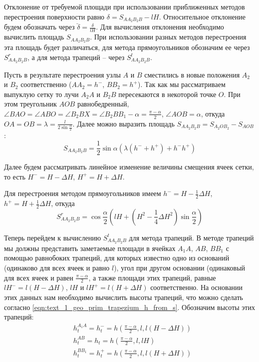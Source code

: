 Отклонение от требуемой площади при использовании приближенных методов перестроения поверхности равно $\delta = S_{AA_2B_2B} - lH$.
Относительное отклонение будем обозначать через $\breve{\delta} = \frac{\delta}{lH}$.
Для вычисления отклонения необходимо вычислить площадь $S_{AA_2B_2B}$.
При использовании разных методов перестроения эта площадь будет различаться, для метода прямоугольников обозначим ее через $S_{AA_2B_2B}^r$, а для метода трапеций -- через $S_{AA_2B_2B}^t$.

Пусть в результате перестроения узлы $A$ и $B$ сместились в новые положения $A_2$ и $B_2$ соответственно ($AA_2 = h^{-}$, $BB_2 = h^{+}$).
Так как мы рассматриваем выпуклую сетку то лучи $A_2A$ и $B_2B$ пересекаются в некоторой точке $O$.
При этом треугольник $AOB$ равнобедренный, $\angle BAO = \angle ABO = \angle B_2BX = \angle B_2BB_1 - \alpha = \frac{\pi - \alpha}{2}$, $\angle AOB = \alpha$, откуда $OA = OB = \lambda = \frac{l}{2 \sin \frac{\alpha}{2}}$.
Далее можно выразить площадь $S_{AA_2B_2B} = S_{A_2OB_2} - S_{AOB}$:
\begin{equation}\label{eqn:text_1_remesh2_saa2b2b_gen}
	S_{AA_2B_2B} = \frac{1}{2} \sin \alpha \left( \lambda(h^{-} + h^{+}) + h^{-}h^{+} \right)
\end{equation}

Далее будем рассматривать линейное изменение величины смещения ячеек сетки, то есть $H^{-} = H - \Delta H$, $H^{+} = H + \Delta H$.

Для перестроения методом прямоугольников имеем $h^{-} = H - \frac{1}{2} \Delta H$, $h^{+} = H + \frac{1}{2} \Delta H$, откуда
\begin{equation}\label{eqn:text_1_remesh2_s_rect}
	S_{AA_2B_2B}^r = \cos \frac{\alpha}{2} \left( lH + \left( H^2 - \frac{1}{4} \Delta H^2 \right) \sin \frac{\alpha}{2} \right)
\end{equation}

Теперь перейдем к вычислению $S_{AA_2B_2B}^t$ для метода трапеций.
В методе трапеций мы должны представить заметаемые площади в ячейках $A_1A$, $AB$, $BB_1$ с помощью равнобоких трапеций, для которых известно одно из оснований (одинаково для всех ячеек и равно $l$), угол при другом основании (одинаковый для всех ячеек и равен $\frac{\pi - \alpha}{2}$, а также площади этих трапеций, равные $lH^{-} = l(H - \Delta H)$, $lH$ и $lH^{+} = l(H + \Delta H)$ соответственно.
На основании этих данных нам необходимо вычислить высоты трапеций, что можно сделать согласно \eqref{eqn:text_1_geo_prim_trapezium_h_from_s}.
Обозначим высоты этих трапеций:
\begin{equation}
	\begin{aligned}	
		& h_t^{A_1A} = h_t^{-} = h\left(\frac{\pi - \alpha}{2}, l, l(H - \Delta H)\right) \\ 
		& h_t^{AB} = h_t = h\left(\frac{\pi - \alpha}{2}, l, lH\right) \\
		& h_t^{BB_1} = h_t^{+} = h\left(\frac{\pi - \alpha}{2}, l, l(H + \Delta H)\right)
	\end{aligned}
\end{equation}


